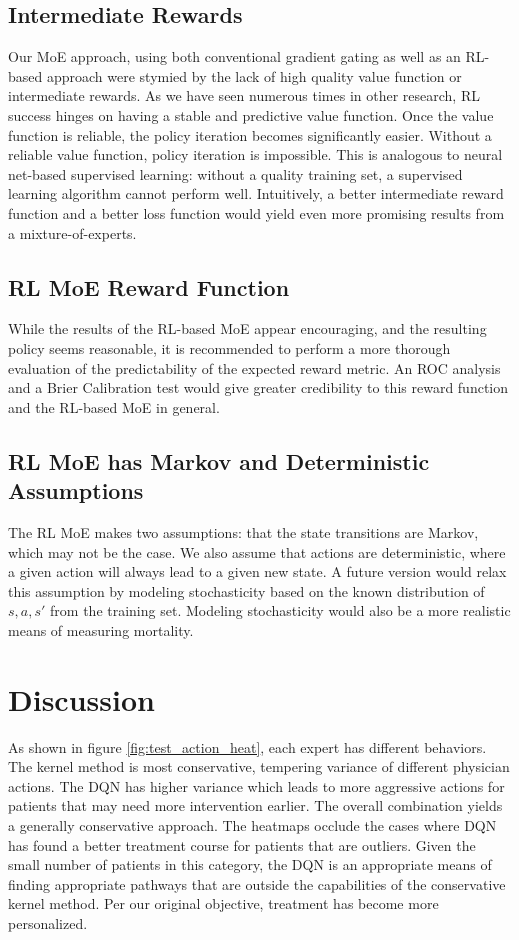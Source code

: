 \documentclass[letterpaper]{article}
\begin{document}
\subsection{Intermediate Rewards}
Our MoE approach, using both conventional gradient gating as well as an RL-based approach
were stymied by the lack of high quality value function or intermediate rewards. As we have seen numerous
times in other research, RL success hinges on having
a stable and predictive value function. Once the value function is reliable, the
policy iteration becomes significantly easier. Without a reliable value function, 
policy iteration is impossible. This is analogous to neural net-based supervised learning:
without a quality training set, a supervised learning algorithm cannot perform well.
Intuitively, a better intermediate reward function and a better loss function would yield
even more promising results from a mixture-of-experts.


\subsection{RL MoE Reward Function}
\label{RLreward}
While the results of the RL-based MoE appear encouraging, and the resulting policy seems
reasonable, it is recommended to perform a more thorough evaluation of the 
predictability of the expected reward metric. An ROC analysis and a Brier Calibration test would
give greater credibility to this reward function and the RL-based MoE in general.

\subsection{RL MoE has Markov and Deterministic Assumptions}

The RL MoE makes two assumptions: that the state transitions are Markov, which may
not be the case. We also assume that actions are deterministic, where a given action
will always lead to a given new state. A future version would relax this assumption
by modeling stochasticity based on the known distribution of $s, a, s'$ from the
training set. Modeling stochasticity would also be a more realistic means of measuring mortality.

\section{Discussion}

As shown in figure \ref{fig:test_action_heat}, each expert has different behaviors. 
The kernel method is most conservative, tempering variance of different physician
actions. The DQN has higher variance which leads to more aggressive actions for
patients that may need more intervention earlier. The overall combination
yields a generally conservative approach. The heatmaps occlude the cases where
DQN has found a better treatment course for patients that are outliers. Given the small
number of patients in this category, the DQN is an appropriate means of finding 
appropriate pathways that are outside the capabilities of the conservative kernel method.
Per our original objective, treatment has become more personalized.
\end{document}
